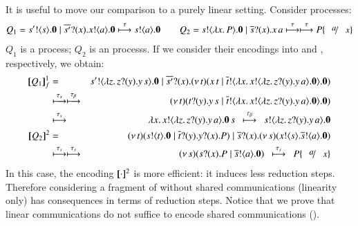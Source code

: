 It is useful to move our comparison 
to a purely linear setting. %
Consider processes:
\begin{eqnarray*}
	Q_1  =  \bout{s'}{s} \inact \Par \binp{\dual{s'}}{x} \bout{x}{a} \inact
	\hby{\tau}
	\bout{s}{a} \inact \qquad
	Q_2  =  \bout{s}{\abs{x}{P}} \inact \Par \binp{\dual{s}}{x} \appl{x}{a}
	\hby{\tau}
	\hby{\tau}
	P \subst{a}{x}
\end{eqnarray*}
$Q_1$ is a \sessp process; $Q_2$ is an \HO processs.
If we consider their encodings into \HO and \sessp, respectively,
we obtain:
\begin{eqnarray*}
	\map{Q_1}_f^{1} & = & \bout{s'}{\abs{z}{\binp{z}{y} \appl{y}{s}}} \inact \Par \binp{\dual{s'}}{x} \newsp{t}{\appl{x}{t} \Par \bout{\dual{t}}{\abs{x}{\bout{x}{\abs{z}{\binp{z}{y} \appl{y}{a}}} \inact}} \inact}\\
	& \hby{\stau} \hby{\btau}& 
	\newsp{t}{\binp{t}{y} \appl{y}{s} \Par \bout{\dual{t}}{\abs{x}{\bout{x}{\abs{z}{\binp{z}{y} \appl{y}{a}}} \inact}} \inact}\\
	& \hby{\stau} & 
	\appl{\abs{x}{\bout{x}{\abs{z}{\binp{z}{y} \appl{y}{a}}} \inact}}{s}
	~~\hby{\btau}~~
	\bout{s}{\abs{z}{\binp{z}{y} \appl{y}{a}}} \inact \\
	\pmap{Q_2}{2} & = & \newsp{t}{\bout{s}{t} \inact \Par \binp{\dual{t}}{y} \binp{y}{x} P} \Par \binp{\dual{s}}{x} \newsp{s}{\bout{x}{s} \bout{\dual{s}}{a} \inact}
	\\
	& \hby{\stau} \hby{\stau} & 
	\newsp{s}{\binp{s}{x} P \Par \bout{\dual{s}}{a} \inact}
	~~
	\hby{\stau} ~~
	P\subst{a}{x}
\end{eqnarray*}
\noi In this case, the encoding $[\!\![\cdot]\!\!]^2$ is more efficient: it induces less reduction steps.
Therefore considering a fragment of \HOp without shared communications (linearity only)
has consequences in terms of reduction steps. Notice that we prove that linear communications do 
not suffice to encode shared communications ().

